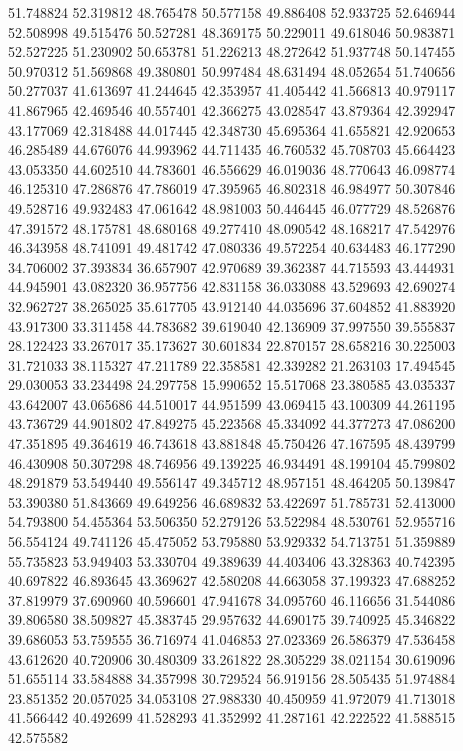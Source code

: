 51.748824
52.319812
48.765478
50.577158
49.886408
52.933725
52.646944
52.508998
49.515476
50.527281
48.369175
50.229011
49.618046
50.983871
52.527225
51.230902
50.653781
51.226213
48.272642
51.937748
50.147455
50.970312
51.569868
49.380801
50.997484
48.631494
48.052654
51.740656
50.277037
41.613697
41.244645
42.353957
41.405442
41.566813
40.979117
41.867965
42.469546
40.557401
42.366275
43.028547
43.879364
42.392947
43.177069
42.318488
44.017445
42.348730
45.695364
41.655821
42.920653
46.285489
44.676076
44.993962
44.711435
46.760532
45.708703
45.664423
43.053350
44.602510
44.783601
46.556629
46.019036
48.770643
46.098774
46.125310
47.286876
47.786019
47.395965
46.802318
46.984977
50.307846
49.528716
49.932483
47.061642
48.981003
50.446445
46.077729
48.526876
47.391572
48.175781
48.680168
49.277410
48.090542
48.168217
47.542976
46.343958
48.741091
49.481742
47.080336
49.572254
40.634483
46.177290
34.706002
37.393834
36.657907
42.970689
39.362387
44.715593
43.444931
44.945901
43.082320
36.957756
42.831158
36.033088
43.529693
42.690274
32.962727
38.265025
35.617705
43.912140
44.035696
37.604852
41.883920
43.917300
33.311458
44.783682
39.619040
42.136909
37.997550
39.555837
28.122423
33.267017
35.173627
30.601834
22.870157
28.658216
30.225003
31.721033
38.115327
47.211789
22.358581
42.339282
21.263103
17.494545
29.030053
33.234498
24.297758
15.990652
15.517068
23.380585
43.035337
43.642007
43.065686
44.510017
44.951599
43.069415
43.100309
44.261195
43.736729
44.901802
47.849275
45.223568
45.334092
44.377273
47.086200
47.351895
49.364619
46.743618
43.881848
45.750426
47.167595
48.439799
46.430908
50.307298
48.746956
49.139225
46.934491
48.199104
45.799802
48.291879
53.549440
49.556147
49.345712
48.957151
48.464205
50.139847
53.390380
51.843669
49.649256
46.689832
53.422697
51.785731
52.413000
54.793800
54.455364
53.506350
52.279126
53.522984
48.530761
52.955716
56.554124
49.741126
45.475052
53.795880
53.929332
54.713751
51.359889
55.735823
53.949403
53.330704
49.389639
44.403406
43.328363
40.742395
40.697822
46.893645
43.369627
42.580208
44.663058
37.199323
47.688252
37.819979
37.690960
40.596601
47.941678
34.095760
46.116656
31.544086
39.806580
38.509827
45.383745
29.957632
44.690175
39.740925
45.346822
39.686053
53.759555
36.716974
41.046853
27.023369
26.586379
47.536458
43.612620
40.720906
30.480309
33.261822
28.305229
38.021154
30.619096
51.655114
33.584888
34.357998
30.729524
56.919156
28.505435
51.974884
23.851352
20.057025
34.053108
27.988330
40.450959
41.972079
41.713018
41.566442
40.492699
41.528293
41.352992
41.287161
42.222522
41.588515
42.575582

